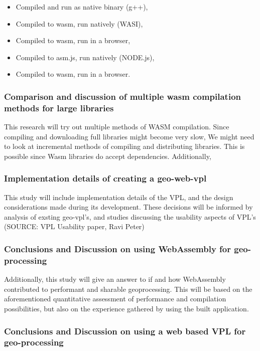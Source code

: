 \begin{itemize}
    \item Compiled and run as native binary (g++), 
    \item Compiled to wasm, run natively (WASI),
    \item Compiled to wasm, run in a browser,
    \item Compiled to asm.js, run natively (NODE.js),
    \item Compiled to wasm, run in a browser. 
\end{itemize}


\subsubsection*{Comparison and discussion of multiple wasm compilation methods for large libraries}
This research will try out multiple methods of WASM compilation. 
Since compiling and downloading full libraries might become very slow, We might need to look at incremental methods of compiling and distributing libraries. 
This is possible since Wasm libraries do accept dependencies. 
Additionally, 


\subsubsection*{Implementation details of creating a geo-web-vpl}

This study will include implementation details of the VPL, and the design considerations made during its development. These decisions will be informed by analysis of exsting geo-vpl's, and studies discussing the usability aspects of VPL's (SOURCE: VPL Usability paper,  Ravi Peter)


\subsubsection*{Conclusions and Discussion on using WebAssembly for geo-processing}

Additionally, this study will give an answer to if and how WebAssembly contributed to performant and sharable geoprocessing. 
This will be based on the aforementioned quantitative assessment of performance and compilation possibilities, but also on the experience gathered by using the built application.  

\subsubsection*{Conclusions and Discussion on using a web based VPL for geo-processing}

